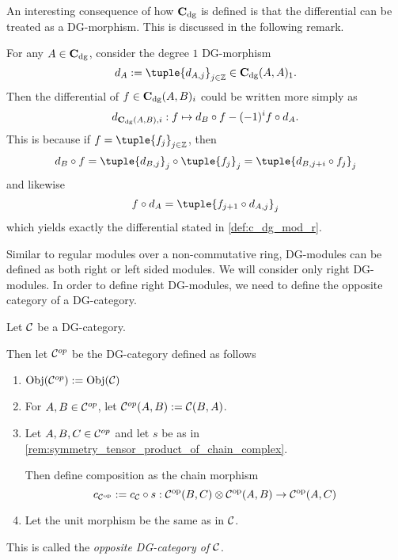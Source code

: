An interesting consequence of how \( \operatorname{\mathbf{C}}_{\operatorname{dg}} \) is defined is that the differential can be treated as a DG-morphism. This is discussed in the following remark.
\begin{remark}
    \label{rem:c_dg_differential}
    For any \( A \in \operatorname{\mathbf{C}}_{\operatorname{dg}} \), consider the degree \( 1 \) DG-morphism
    \[
        d_A := \tuple{ d_{A, j} }_{j \in \Zb} \in \C_{\dg}(A, A)_1.
    \]
    Then the differential of \( f \in \operatorname{\mathbf{C}}_{\operatorname{dg}}(A, B)_i \) could be written more simply as
    \[
        d_{\operatorname{\mathbf{C}}_{\operatorname{dg}}(A, B), i}: f \mapsto d_B \circ f - (-1)^i f \circ d_A.
    \]
    This is because if \( f = \tuple{f_j}_{j \in \Zb} \), then
    \[
        d_B \circ f = \tuple{d_{B, j} }_j \circ \tuple{ f_j }_j = \tuple{ d_{B, j + i} \circ f_j }_j
    \]
    and likewise
    \[
        f \circ d_A = \tuple{f_{j + 1} \circ d_{A, j}}_j
    \]
    which yields exactly the differential stated in \autoref{def:c_dg_mod_r}.
\end{remark}

Similar to regular modules over a non-commutative ring, DG-modules can be defined as both right or left sided modules. We will consider only right DG-modules. In order to define right DG-modules, we need to define the opposite category of a DG-category.

\begin{definition}
    \label{def:opposite_dg_category}
    Let \( {\mathcal{C}} \) be a DG-category.

    Then let \( {\mathcal{C}}^{op} \) be the DG-category defined as follows
    \begin{enumerate}
        \item {
            \( \operatorname{Obj}({\mathcal{C}}^{op}) := \operatorname{Obj}({\mathcal{C}}) \)
        }
        \item {
            For \( A, B \in {\mathcal{C}}^{op} \), let \( {\mathcal{C}}^{op}(A, B) := {\mathcal{C}}(B, A) \).
        }
        \item {
            Let \( A, B, C \in {\mathcal{C}}^{op} \) and let \( s \) be as in \autoref{rem:symmetry_tensor_product_of_chain_complex}.
            
            Then define composition as the chain morphism
            \[
                c_{{\mathcal{C}}^{\operatorname{op}}} :=  c_{{\mathcal{C}}} \circ s: {\mathcal{C}}^{\operatorname{op}} (B, C) \otimes {\mathcal{C}}^{\operatorname{op}} (A, B) \to {\mathcal{C}}^{\operatorname{op}} (A, C)
            \]
        }
        \item {
            Let the unit morphism be the same as in \( {\mathcal{C}} \).
        }
    \end{enumerate}
    This is called the \emph{opposite DG-category of \( {\mathcal{C}} \)}.
\end{definition}

